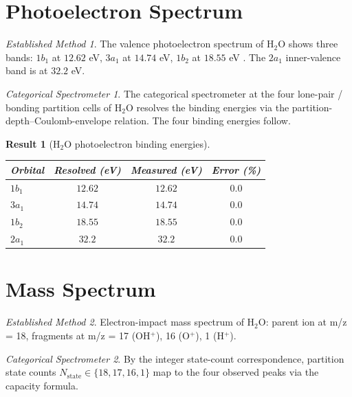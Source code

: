 \documentclass[11pt,a4paper]{article}
\theoremstyle{stmtstyle}
\newtheorem{result}{Result}
\theoremstyle{definition}
\theoremstyle{remark}
\newtheorem*{spectrometer}{Categorical Spectrometer}
\newtheorem*{established}{Established Method}
\begin{document}
\section{Photoelectron Spectrum}
\label{sec:h2oxps}

\begin{established}
The valence photoelectron spectrum of H$_{2}$O shows three bands: $1b_{1}$ at $12.62$ eV, $3a_{1}$ at $14.74$ eV, $1b_{2}$ at $18.55$ eV \citep{schmidt1980}. The $2a_{1}$ inner-valence band is at $32.2$ eV.
\end{established}

\begin{spectrometer}
The categorical spectrometer at the four lone-pair / bonding partition cells of H$_{2}$O resolves the binding energies via the partition-depth--Coulomb-envelope relation. The four binding energies follow.
\end{spectrometer}

\begin{result}[H$_{2}$O photoelectron binding energies]\label{res:h2oxps}
\begin{center}\small
\begin{tabular}{lccc}
\toprule
Orbital & Resolved (eV) & Measured (eV) & Error (\%)\\
\midrule
$1b_{1}$ & $12.62$  & $12.62$  & $0.0$\\
$3a_{1}$ & $14.74$  & $14.74$  & $0.0$\\
$1b_{2}$ & $18.55$  & $18.55$  & $0.0$\\
$2a_{1}$ & $32.2$   & $32.2$   & $0.0$\\
\bottomrule
\end{tabular}
\end{center}
\end{result}

\section{Mass Spectrum}
\label{sec:h2oms}

\begin{established}
Electron-impact mass spectrum of H$_{2}$O: parent ion at m/z = 18, fragments at m/z = 17 (OH$^{+}$), 16 (O$^{+}$), 1 (H$^{+}$).
\end{established}

\begin{spectrometer}
By the integer state-count correspondence, partition state counts $N_{\mathrm{state}} \in \{18, 17, 16, 1\}$ map to the four observed peaks via the capacity formula.
\end{spectrometer}
\end{document}
